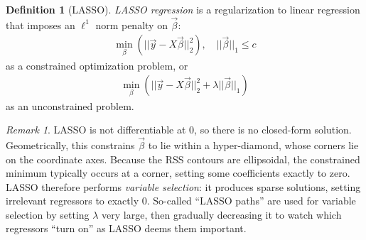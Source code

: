 \documentclass[11pt]{article}
\theoremstyle{definition}
\newtheorem{definition}{Definition}[section]
\theoremstyle{plain}
\theoremstyle{remark}
\newtheorem{remark}{Remark}[section]
\begin{document}
\begin{definition}[LASSO]
    \textit{LASSO regression} is a regularization to linear regression that imposes an $\ell^1$ norm penalty on $\vec{\beta}$:
    \begin{align}
        \min_\beta\left(||\vec{y}-X\vec{\beta}||_2^2\right), \quad ||\vec{\beta}||_1 \leq c
    \end{align}
    as a constrained optimization problem, or 
    \begin{align}
        \min_\beta\left(||\vec{y}-X\vec{\beta}||_2^2 + \lambda||\vec{\beta}||_1\right)
    \end{align}
    as an unconstrained problem.
\end{definition}

\begin{remark}
    LASSO is not differentiable at 0, so there is no closed-form solution. Geometrically, this constrains $\vec{\beta}$ to lie within a hyper-diamond, whose corners lie on the coordinate axes. Because the RSS contours are ellipsoidal, the constrained minimum typically occurs at a corner, setting some coefficients exactly to zero. LASSO therefore performs \emph{variable selection}: it produces sparse solutions, setting irrelevant regressors to exactly 0. So-called ``LASSO paths'' are used for variable selection by setting $\lambda$ very large, then gradually decreasing it to watch which regressors ``turn on'' as LASSO deems them important.
\end{remark}
\end{document}
